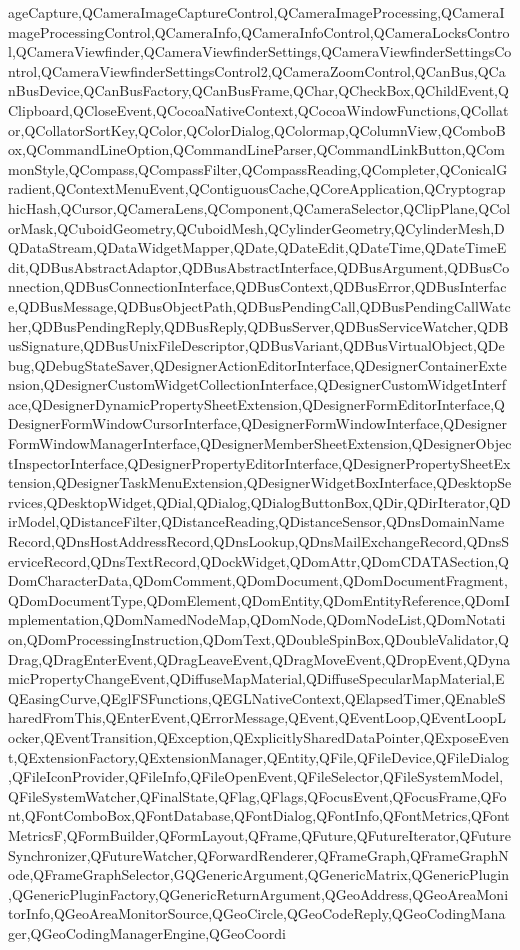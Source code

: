 {{ageCapture,QCameraImageCaptureControl,QCameraImageProcessing,QCameraImageProcessingControl,QCameraInfo,QCameraInfoControl,QCameraLocksControl,QCameraViewfinder,QCameraViewfinderSettings,QCameraViewfinderSettingsControl,QCameraViewfinderSettingsControl2,QCameraZoomControl,QCanBus,QCanBusDevice,QCanBusFactory,QCanBusFrame,QChar,QCheckBox,QChildEvent,QClipboard,QCloseEvent,QCocoaNativeContext,QCocoaWindowFunctions,QCollator,QCollatorSortKey,QColor,QColorDialog,QColormap,QColumnView,QComboBox,QCommandLineOption,QCommandLineParser,QCommandLinkButton,QCommonStyle,QCompass,QCompassFilter,QCompassReading,QCompleter,QConicalGradient,QContextMenuEvent,QContiguousCache,QCoreApplication,QCryptographicHash,QCursor,QCameraLens,QComponent,QCameraSelector,QClipPlane,QColorMask,QCuboidGeometry,QCuboidMesh,QCylinderGeometry,QCylinderMesh,DQDataStream,QDataWidgetMapper,QDate,QDateEdit,QDateTime,QDateTimeEdit,QDBusAbstractAdaptor,QDBusAbstractInterface,QDBusArgument,QDBusConnection,QDBusConnectionInterface,QDBusContext,QDBusError,QDBusInterface,QDBusMessage,QDBusObjectPath,QDBusPendingCall,QDBusPendingCallWatcher,QDBusPendingReply,QDBusReply,QDBusServer,QDBusServiceWatcher,QDBusSignature,QDBusUnixFileDescriptor,QDBusVariant,QDBusVirtualObject,QDebug,QDebugStateSaver,QDesignerActionEditorInterface,QDesignerContainerExtension,QDesignerCustomWidgetCollectionInterface,QDesignerCustomWidgetInterface,QDesignerDynamicPropertySheetExtension,QDesignerFormEditorInterface,QDesignerFormWindowCursorInterface,QDesignerFormWindowInterface,QDesignerFormWindowManagerInterface,QDesignerMemberSheetExtension,QDesignerObjectInspectorInterface,QDesignerPropertyEditorInterface,QDesignerPropertySheetExtension,QDesignerTaskMenuExtension,QDesignerWidgetBoxInterface,QDesktopServices,QDesktopWidget,QDial,QDialog,QDialogButtonBox,QDir,QDirIterator,QDirModel,QDistanceFilter,QDistanceReading,QDistanceSensor,QDnsDomainNameRecord,QDnsHostAddressRecord,QDnsLookup,QDnsMailExchangeRecord,QDnsServiceRecord,QDnsTextRecord,QDockWidget,QDomAttr,QDomCDATASection,QDomCharacterData,QDomComment,QDomDocument,QDomDocumentFragment,QDomDocumentType,QDomElement,QDomEntity,QDomEntityReference,QDomImplementation,QDomNamedNodeMap,QDomNode,QDomNodeList,QDomNotation,QDomProcessingInstruction,QDomText,QDoubleSpinBox,QDoubleValidator,QDrag,QDragEnterEvent,QDragLeaveEvent,QDragMoveEvent,QDropEvent,QDynamicPropertyChangeEvent,QDiffuseMapMaterial,QDiffuseSpecularMapMaterial,EQEasingCurve,QEglFSFunctions,QEGLNativeContext,QElapsedTimer,QEnableSharedFromThis,QEnterEvent,QErrorMessage,QEvent,QEventLoop,QEventLoopLocker,QEventTransition,QException,QExplicitlySharedDataPointer,QExposeEvent,QExtensionFactory,QExtensionManager,QEntity,QFile,QFileDevice,QFileDialog,QFileIconProvider,QFileInfo,QFileOpenEvent,QFileSelector,QFileSystemModel,QFileSystemWatcher,QFinalState,QFlag,QFlags,QFocusEvent,QFocusFrame,QFont,QFontComboBox,QFontDatabase,QFontDialog,QFontInfo,QFontMetrics,QFontMetricsF,QFormBuilder,QFormLayout,QFrame,QFuture,QFutureIterator,QFutureSynchronizer,QFutureWatcher,QForwardRenderer,QFrameGraph,QFrameGraphNode,QFrameGraphSelector,GQGenericArgument,QGenericMatrix,QGenericPlugin,QGenericPluginFactory,QGenericReturnArgument,QGeoAddress,QGeoAreaMonitorInfo,QGeoAreaMonitorSource,QGeoCircle,QGeoCodeReply,QGeoCodingManager,QGeoCodingManagerEngine,QGeoCoordi}}
